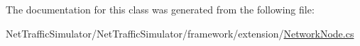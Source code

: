 The documentation for this class was generated from the following file\-:\begin{DoxyCompactItemize}
\item 
Net\-Traffic\-Simulator/\-Net\-Traffic\-Simulator/framework/extension/\hyperlink{NetworkNode_8cs}{Network\-Node.\-cs}\end{DoxyCompactItemize}
